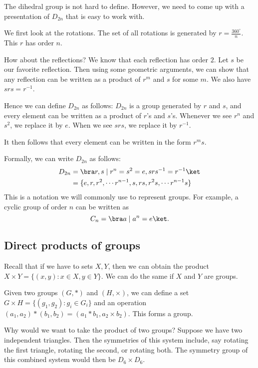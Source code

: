 \documentclass[a4paper]{article}
\begin{document}
The dihedral group is not hard to define. However, we need to come up with a presentation of $D_{2n}$ that is easy to work with.

We first look at the rotations. The set of all rotations is generated by $r = \frac{360^\circ}{n}$. This $r$ has order $n$.

How about the reflections? We know that each reflection has order $2$. Let $s$ be our favorite reflection. Then using some geometric arguments, we can show that any reflection can be written as a product of $r^m$ and $s$ for some $m$. We also have $srs = r^{-1}$.

Hence we can define $D_{2n}$ as follows: $D_{2n}$ is a group generated by $r$ and $s$, and every element can be written as a product of $r$'s and $s$'s. Whenever we see $r^n$ and $s^2$, we replace it by $e$. When we see $srs$, we replace it by $r^{-1}$.

It then follows that every element can be written in the form $r^m s$.

Formally, we can write $D_{2n}$ as follows:
\begin{align*}
  D_{2n} &= \bra r, s\mid r^n=s^2=e, srs^{-1} = r^{-1}\ket\\
  &= \{e, r, r^2, \cdots r^{n-1}, s, rs, r^2s, \cdots r^{n-1}s\}
\end{align*}
This is a notation we will commonly use to represent groups. For example, a cyclic group of order $n$ can be written as
\[
  C_n = \bra a\mid a^n =e \ket.
\]

\subsection{Direct products of groups}
Recall that if we have to sets $X, Y$, then we can obtain the product $X\times Y = \{(x, y): x\in X, y\in Y\}$. We can do the same if $X$ and $Y$ are groups.

\begin{defi}
  Given two groups $(G, *)$ and $(H, \times)$, we can define a set $G\times H = \{(g_1, g_2): g_i\in G_i\}$ and an operation $(a_1, a_2)*(b_1, b_2) = (a_1*b_1, a_2\times b_2)$. This forms a group.
\end{defi}

Why would we want to take the product of two groups? Suppose we have two independent triangles. Then the symmetries of this system include, say rotating the first triangle, rotating the second, or rotating both. The symmetry group of this combined system would then be $D_6 \times D_6$.
\end{document}

